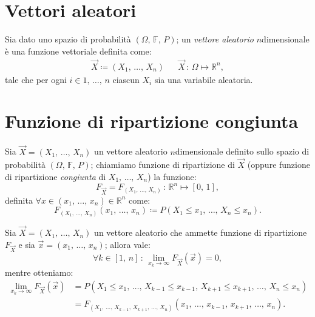     \section{Vettori aleatori}
        \begin{defn}
            Sia dato uno spazio di probabilità $(\Omega,\,\mathbb{F},\,P)$; un \emph{vettore aleatorio} $n$\nbdash dimensionale è una funzione vettoriale definita come:
            \begin{align*}
                \vec{X} \coloneqq (X_1,\, \ldots,\, X_{n}) & &
                \vec{X}\,:\, \Omega \mapsto \mathbb{R}^n
            ,\end{align*}
            tale che per ogni $i \in 1,\, \ldots,\, n$ ciascun $X_i$ sia una variabile aleatoria.
        \end{defn}
    \section{Funzione di ripartizione congiunta}
        \begin{defn}
            Sia $\vec{X} = (X_1,\, \ldots,\, X_{n})$ un vettore aleatorio $n$\nbdash dimensionale definito sullo spazio di probabilità $(\Omega,\,\mathbb{F},\,P)$; chiamiamo funzione di ripartizione di $\vec{X}$ (oppure funzione di ripartizione \emph{congiunta} di $X_1,\, \ldots,\, X_{n}$) la funzione: \[
                F_{\vec{X}} = F_{(X_1,\, \ldots,\, X_{n})} \,:\, \mathbb{R}^n \mapsto [0,\,1]
            ,\] definita $\forall x \in (x_1,\, \ldots,\, x_{n}) \in \mathbb{R}^n$ come: \[
                F_{(X_1,\, \ldots,\, X_{n})}(x_1,\, \ldots,\, x_{n}) \coloneqq P(X_1 \leq x_1,\, \ldots,\, X_n \leq x_n)
            .\]
        \end{defn}
        \begin{prty}\label{prty:Convergenza_ripartizione_congiunta}
            Sia $\vec{X} = (X_1,\, \ldots,\, X_{n})$ un vettore aleatorio che ammette funzione di ripartizione $F_{\vec{X}}$ e sia $\vec{x} = (x_1,\, \ldots,\, x_{n})$; allora vale: \[
                \forall k \in [1,\,n] \,:\, \lim_{x_k \to \infty} F_{\vec{X}}(\vec{x}) = 0
            ,\] mentre otteniamo:
            \begin{align*}
                \lim_{x_k \to \infty} F_{\vec{X}}(\vec{x}) &= 
                P(X_1 \leq x_1,\, \ldots,\, X_{k-1} \leq x_{k-1},\, X_{k+1} \leq x_{k+1},\, \ldots,\, X_n \leq x_n) \\
                                                           &= F_{(X_1,\, \ldots,\, X_{k-1},\, X_{k+1},\, \ldots,\, X_{n})}(x_1,\, \ldots,\, x_{k-1},\, x_{k+1},\, \ldots,\, x_{n})
            .\end{align*}
        \end{prty}
